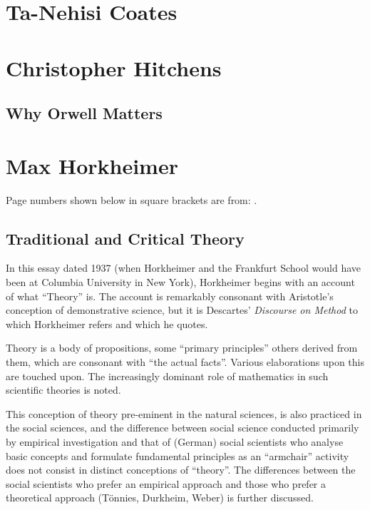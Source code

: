 \documentclass[10pt,titlepage]{book}
\begin{document}
\section{Ta-Nehisi Coates}

\cite{coatestnh-bwm,coatestnh-wweyip}

\section{Christopher Hitchens}

\subsection{Why Orwell Matters}

\cite{hitchens-wom}

\section{Max Horkheimer}

Page numbers shown below in square brackets are from: \cite{horkheimer-crit}.

\subsection{Traditional and Critical Theory}

In this essay \cite{horkheimer-trad, horkheimer-crit} dated 1937 (when Horkheimer and the Frankfurt School would have been at Columbia University in New York), Horkheimer begins with an account of what ``Theory'' is.
The account is remarkably consonant with Aristotle's conception of demonstrative science, but it is Descartes' \emph{Discourse on Method}\cite{descartesDOM} to which Horkheimer refers and which he quotes.

Theory is a body of propositions, some ``primary principles'' others derived from them, which are consonant with ``the actual facts''.
Various elaborations upon this are touched upon.
The increasingly dominant role of mathematics in such scientific theories is noted.

This conception of theory pre-eminent in the natural sciences, is also practiced in the social sciences, and the difference between social science conducted primarily by empirical investigation and that of (German) social scientists who analyse basic concepts and formulate fundamental principles as an ``armchair'' activity does not consist in distinct conceptions of ``theory''.
The differences between the social scientists who prefer an empirical approach and those who prefer a theoretical approach (T\"{o}nnies, Durkheim, Weber) is further discussed.
\end{document}

